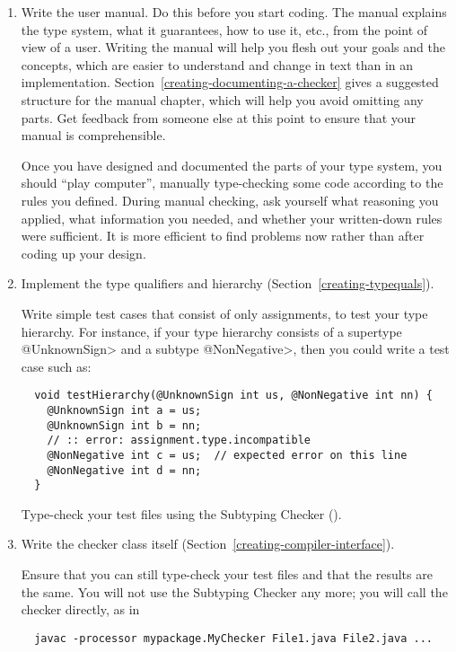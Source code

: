 \begin{enumerate}
\item
  Write the user manual.  Do this before you start coding.  The manual
  explains the type system, what it guarantees, how to use it, etc., from
  the point of view of a user.  Writing the manual will help you flesh out
  your goals and the concepts, which are easier to understand and change in
  text than in an implementation.
  Section~\ref{creating-documenting-a-checker} gives a suggested structure
  for the manual chapter, which will help you avoid omitting any parts.
  Get feedback from someone else at this point to ensure that your manual
  is comprehensible.

  Once you have designed and documented the parts of your type system, you
  should ``play computer'', manually
  type-checking some code according to the rules you defined.
  During manual checking, ask
  yourself what reasoning you applied, what information you needed, and
  whether your written-down rules were sufficient.
  It is more efficient to find problems now rather than after coding up
  your design.

\item
  Implement the type qualifiers and hierarchy
  (Section~\ref{creating-typequals}).

  Write simple test cases that consist of only assignments,
  to test your type hierarchy.  For instance, if
  your type hierarchy consists of a supertype \<@UnknownSign> and a subtype
  \<@NonNegative>, then you could write a test case such as:

\begin{Verbatim}
  void testHierarchy(@UnknownSign int us, @NonNegative int nn) {
    @UnknownSign int a = us;
    @UnknownSign int b = nn;
    // :: error: assignment.type.incompatible
    @NonNegative int c = us;  // expected error on this line
    @NonNegative int d = nn;
  }
\end{Verbatim}

  Type-check your test files using the Subtyping Checker
  ().

\item
  Write the checker class itself
  (Section~\ref{creating-compiler-interface}).

  Ensure that you can still type-check your test files and that the results
  are the same.  You will not use the Subtyping Checker any more; you will
  call the checker directly, as in

\begin{Verbatim}
  javac -processor mypackage.MyChecker File1.java File2.java ...
\end{Verbatim}


\end{enumerate}
